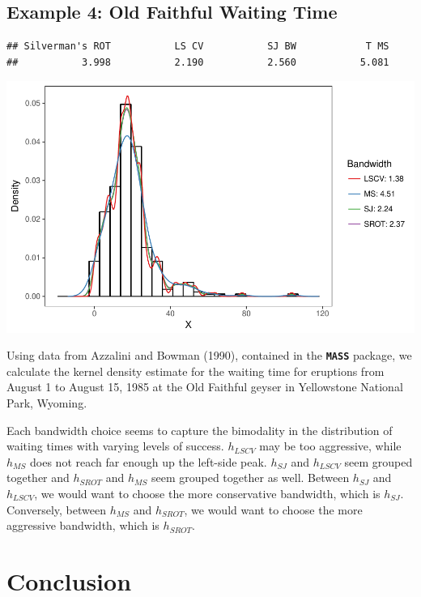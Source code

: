 \documentclass[]{article}
\begin{document}
\subsection{Example 4: Old Faithful Waiting Time}

\begin{verbatim}
## Silverman's ROT           LS CV           SJ BW            T MS 
##           3.998           2.190           2.560           5.081
\end{verbatim}

\includegraphics{FinalReport_files/figure-latex/unnamed-chunk-8-1.pdf}

Using data from Azzalini and Bowman (1990), contained in the
\textbf{\texttt{MASS}} package, we calculate the kernel density estimate
for the waiting time for eruptions from August 1 to August 15, 1985 at
the Old Faithful geyser in Yellowstone National Park, Wyoming.

Each bandwidth choice seems to capture the bimodality in the
distribution of waiting times with varying levels of success.
\(h_{LSCV}\) may be too aggressive, while \(h_{MS}\) does not reach far
enough up the left-side peak. \(h_{SJ}\) and \(h_{LSCV}\) seem grouped
together and \(h_{SROT}\) and \(h_{MS}\) seem grouped together as well.
Between \(h_{SJ}\) and \(h_{LSCV}\), we would want to choose the more
conservative bandwidth, which is \(h_{SJ}\). Conversely, between
\(h_{MS}\) and \(h_{SROT}\), we would want to choose the more aggressive
bandwidth, which is \(h_{SROT}\).

\section{Conclusion}\label{conclusion}
\end{document}
